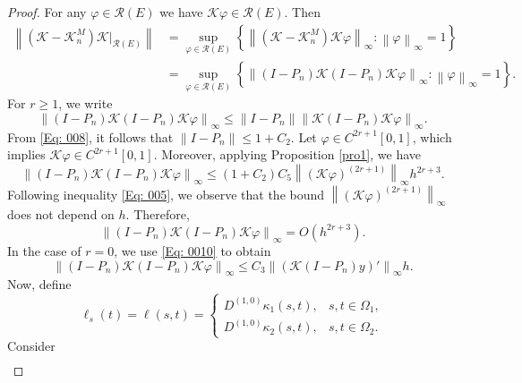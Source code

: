 \documentclass[pdflatex, sn-mathphys-num]{sn-jnl}%
\newcommand{\norm}[1]{\left\lVert #1\right\rVert}
\theoremstyle{thmstyleone}%
\theoremstyle{thmstyletwo}%
\theoremstyle{thmstylethree}%
\begin{document}
\begin{proof}
	For any \(\varphi \in \mathcal{R}(E)\) we have  \( \mathcal{K}\varphi \in \mathcal{R}(E)\). Then 
	\begin{align*}
		\norm{(\mathcal{K} - \mathcal{K}_n^M) \mathcal{K} |_{\mathcal{R}(E)}} &= \sup_{\varphi \in \mathcal{R}(E)}\left\{ 	\norm{(\mathcal{K} - \mathcal{K}_n^M) \mathcal{K}\varphi}_\infty : \norm{\varphi}_\infty =1 \right\} \\
		&= \sup_{\varphi \in \mathcal{R}(E)}\left\{ \norm{(I - P_n) \mathcal{K}(I - P_n)\mathcal{K}\varphi}_\infty : \norm{\varphi}_\infty =1 \right\}.
	\end{align*}
	For \( r \geq 1 \), we write  
	\begin{equation*}
		\norm{(I - P_n) \mathcal{K}(I - P_n)\mathcal{K}\varphi}_\infty \leq\norm{I - P_n} \norm{\mathcal{K}(I - P_n)\mathcal{K}\varphi}_\infty.
	\end{equation*}
	From \eqref{Eq: 008}, it follows that \( \norm{I - P_n} \leq 1 +C_2 \). Let \( \varphi \in C^{2r+1}[0,1] \), which implies \( \mathcal{K} \varphi \in C^{2r+1}[0,1] \). Moreover, applying Proposition \ref{pro1}, we have
	\begin{equation*}
		\norm{(I - P_n) \mathcal{K}(I - P_n)\mathcal{K}\varphi}_\infty \leq (1 +C_2)C_5 \norm{(\mathcal{K}\varphi)^{(2r+1)}}_\infty h^{2r+3}.
	\end{equation*}
	Following inequality \eqref{Eq: 005}, we observe that the bound \(\norm{ \left(\mathcal{K}\varphi\right)^{(2r+1)}}_\infty \) does not depend on \(h\). Therefore, 
	\begin{equation} \label{Eq: 0030}
		\norm{(I - P_n) \mathcal{K}(I - P_n)\mathcal{K}\varphi}_\infty = O\left(h^{2r+3}\right).
	\end{equation}
	In the case of \(r=0\), we use \eqref{Eq: 0010} to obtain
	\begin{equation} \label{Eq: 0031}
		\norm{(I - P_n) \mathcal{K}(I - P_n)\mathcal{K}\varphi}_\infty \leq C_3 \norm{\left( \mathcal{K}(I - P_n)y\right)'}_\infty h.
	\end{equation}
	Now, define 
	\begin{equation*}
		\ell_s(t) = \ell(s,t) = \begin{cases}
			D^{(1,0)} \kappa_1(s, t) , & s,t \in \Omega_1, \\
			D^{(1,0)} \kappa_2(s, t) , & s,t \in \Omega_2.
		\end{cases}
	\end{equation*}
	Consider 
	\begin{align*} 

\end{align*}
\end{proof}
\end{document}
